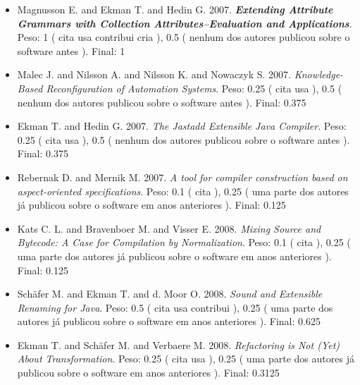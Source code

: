 \begin{itemize}
\item Magnusson E. and Ekman T. and Hedin G.
      2007.
        \textbf{\textit{ Extending Attribute Grammars with Collection Attributes--Evaluation and Applications}}.
      Peso:
      1 (
          cita
          usa
          contribui
          cria
      ),
      0.5 (
nenhum dos autores publicou sobre o software antes
      ).
      Final:
      1

\item Malec J. and Nilsson A. and Nilsson K. and Nowaczyk S.
      2007.
        \textit{ Knowledge-Based Reconfiguration of Automation Systems}.
      Peso:
      0.25 (
          cita
          usa
      ),
      0.5 (
nenhum dos autores publicou sobre o software antes
      ).
      Final:
      0.375

\item Ekman T. and Hedin G.
      2007.
        \textit{ The Jastadd Extensible Java Compiler}.
      Peso:
      0.25 (
          cita
          usa
      ),
      0.5 (
nenhum dos autores publicou sobre o software antes
      ).
      Final:
      0.375

\item Rebernak D. and Mernik M.
      2007.
        \textit{ A tool for compiler construction based on aspect-oriented specifications}.
      Peso:
      0.1 (
          cita
      ),
      0.25 (
uma parte dos autores já publicou sobre o software em anos anteriores
      ).
      Final:
      0.125

\item Kats C. L. and Bravenboer M. and Visser E.
      2008.
        \textit{ Mixing Source and Bytecode: A Case for Compilation by Normalization}.
      Peso:
      0.1 (
          cita
      ),
      0.25 (
uma parte dos autores já publicou sobre o software em anos anteriores
      ).
      Final:
      0.125

\item Sch\"{a}fer M. and Ekman T. and d. Moor O.
      2008.
        \textit{ Sound and Extensible Renaming for Java}.
      Peso:
      0.5 (
          cita
          usa
          contribui
      ),
      0.25 (
uma parte dos autores já publicou sobre o software em anos anteriores
      ).
      Final:
      0.625

\item Ekman T. and Sch\"{a}fer M. and Verbaere M.
      2008.
        \textit{ Refactoring is Not (Yet) About Transformation}.
      Peso:
      0.25 (
          cita
          usa
      ),
      0.25 (
uma parte dos autores já publicou sobre o software em anos anteriores
      ).
      Final:
      0.3125


\end{itemize}
